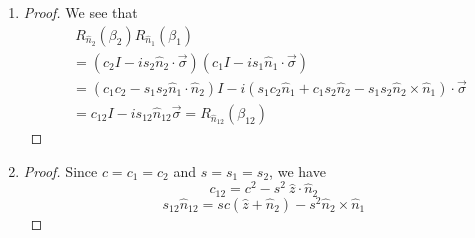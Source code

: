 \documentclass[../main.tex]{subfiles}
\begin{document}
\bigskip
\begin{exercise}
\end{exercise}
\begin{enumerate}
    \item 
    \begin{proof}
    We see that
    \begin{align*}
        &\ R_{\hat{n}_2}(\beta_2)R_{\hat{n}_1}(\beta_1) \\
        &= (c_2 I-i s_2\hat{n}_2\cdot\vec{\sigma})(c_1 I-i s_1\hat{n}_1\cdot\vec{\sigma}) \\
        &= (c_1c_2-s_1s_2\hat{n}_1\cdot\hat{n}_2)I-i(s_1c_2\hat{n}_1+c_1s_2\hat{n}_2-s_1s_2\hat{n}_2\times\hat{n}_1)\cdot\vec{\sigma} \\
        &= c_{12}I-is_{12}\hat{n}_{12}\vec{\sigma} = R_{\hat{n}_{12}}(\beta_{12})
    \end{align*}
    \end{proof}
    
    \item
    \begin{proof}
    Since $c=c_1=c_2$ and $s=s_1=s_2$, we have
    \begin{equation*}
        c_{12}=c^2-s^2\ \hat{z}\cdot\hat{n}_2
    \end{equation*}
    \begin{equation*}
        s_{12}\hat{n}_{12}=s c(\hat{z}+\hat{n}_2)-s^2\hat{n}_2\times\hat{n}_1
    \end{equation*}
    \end{proof}
\end{enumerate}
\end{document}
